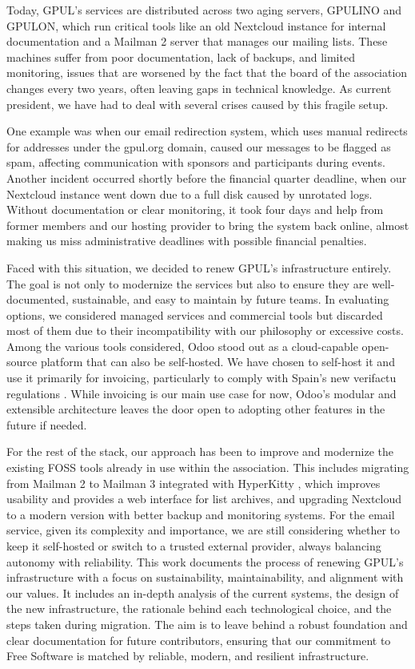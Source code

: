 Today, GPUL's services are distributed across two aging servers, GPULINO and GPULON, which run critical tools like an old Nextcloud instance for internal documentation and a Mailman 2 server that manages our mailing lists. These machines suffer from poor documentation, lack of backups, and limited monitoring, issues that are worsened by the fact that the board of the association changes every two years, often leaving gaps in technical knowledge. As current president, we have had to deal with several crises caused by this fragile setup.

One example was when our email redirection system, which uses manual redirects for addresses under the gpul.org domain, caused our messages to be flagged as spam, affecting communication with sponsors and participants during events. Another incident occurred shortly before the financial quarter deadline, when our Nextcloud instance went down due to a full disk caused by unrotated logs. Without documentation or clear monitoring, it took four days and help from former members and our hosting provider to bring the system back online, almost making us miss administrative deadlines with possible financial penalties.

Faced with this situation, we decided to renew GPUL's infrastructure entirely. The goal is not only to modernize the services but also to ensure they are well-documented, sustainable, and easy to maintain by future teams. In evaluating options, we considered managed services and commercial tools but discarded most of them due to their incompatibility with our philosophy or excessive costs. Among the various tools considered, Odoo \cite{odoo_web} stood out as a cloud-capable open-source platform that can also be self-hosted. We have chosen to self-host it and use it primarily for invoicing, particularly to comply with Spain's new \gls{verifactu} regulations \cite{BOE-A-2024-22138}. While invoicing is our main use case for now, Odoo's modular and extensible architecture leaves the door open to adopting other features in the future if needed.

For the rest of the stack, our approach has been to improve and modernize the existing FOSS tools already in use within the association. This includes migrating from Mailman 2 to Mailman 3 integrated with HyperKitty \cite{hyperkitty_web}, which improves usability and provides a web interface for list archives, and upgrading Nextcloud to a modern version with better backup and monitoring systems. For the email service, given its complexity and importance, we are still considering whether to keep it self-hosted or switch to a trusted external provider, always balancing autonomy with reliability.
This work documents the process of renewing GPUL's infrastructure with a focus on sustainability, maintainability, and alignment with our values. It includes an in-depth analysis of the current systems, the design of the new infrastructure, the rationale behind each technological choice, and the steps taken during migration. The aim is to leave behind a robust foundation and clear documentation for future contributors, ensuring that our commitment to Free Software is matched by reliable, modern, and resilient infrastructure.

